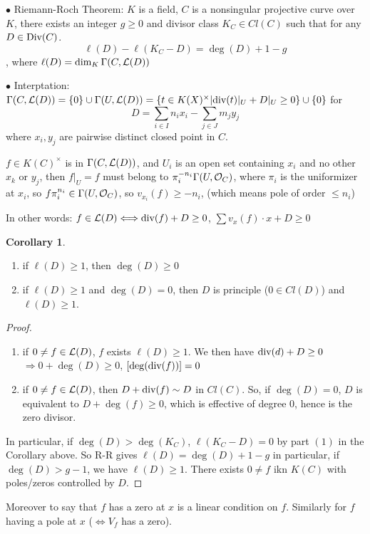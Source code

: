 \documentclass[11pt]{article}
\theoremstyle{definition}
\newtheorem{cor}[thm]{Corollary}
\newcommand{\call}{{\cal L}}
\newcommand{\calo}{{\cal O}}
\renewcommand{\div}{\textnormal{div}}
\newcommand{\Div}{\textnormal{Div}}
\newcommand{\Lrta}{\Longrightarrow}
\newcommand{\Llrta}{\Longleftrightarrow}
\begin{document}
$\bullet$ Riemann-Roch Theorem: $K$ is a field, $C$ is a nonsingular projective curve over $K$, there exists an integer $g\geq 0$ and divisor class $K_C\in Cl(C)$ such that for any $D\in \Div(C)$.
$$
\ell(D)-\ell(K_C-D)=\deg(D)+1-g
$$
, where $\ell(D)=\dim_K\Gamma(C,\call(D))$

$\bullet$ Interptation: $\Gamma(C,\call(D))=\{0\}\cup \Gamma(U,\call(D))=\{t\in K(X)^\times| \div(t)|_U+D|_U \geq 0\}\cup \{0\}$ for 
$$
D=\sum_{i\in I} n_i x_i-\sum_{j\in J} m_j y_j
$$
where $x_i,y_j$ are pairwise distinct closed point in $C$.

$f\in K(C)^\times$ is in $\Gamma(C,\call(D))$, and $U_i$ is an open set containing $x_i$ and no other $x_k$ or $y_j$, then $f|_U=f$ must belong to $\pi_i^{-n_i}\Gamma(U,\calo_C)$, where $\pi_i$ is the uniformizer at $x_i$, so $f\pi_i^{n_i}\in \Gamma(U,\calo_C)$, so $v_{x_i}(f)\geq -n_i$, (which means pole of order $\leq n_i$)

In other words: $f\in \call(D)\Llrta \div(f)+D\geq 0$, $\sum v_x(f)\cdot x+D\geq 0$

\begin{cor}\ 
\begin{enumerate}[label=(\arabic*)]
\item if $\ell(D)\geq 1$, then $\deg(D)\geq 0$
\item if $\ell(D)\geq 1$ and $\deg(D)=0$, then $D$ is principle ($0\in Cl(D)$) and $\ell(D)\geq 1$.
\end{enumerate}
\end{cor}
\begin{proof}\ 
\begin{enumerate}[label=(\arabic*)]
\item if $0\neq f\in \call(D)$, $f$ exists $\ell(D)\geq 1$. We then have $\div(d)+D\geq 0$ $\Lrta 0+\deg(D)\geq 0$, $[\deg(\div(f))]=0$
\item if $0\neq f\in \call(D)$, then $D+\div(f)\sim D$ in $Cl(C)$. So, if $\deg(D)=0$, $D$ is equivalent to $D+\deg(f)\geq 0$, which is effective of degree $0$, hence is the zero divisor.
\end{enumerate}

In particular, if $\deg(D)>\deg(K_C)$, $\ell(K_C-D)=0$ by part $(1)$ in the Corollary above. So R-R
 gives $\ell(D)=\deg(D)+1-g$ in particular, if $\deg(D)>g-1$,  we have $\ell(D)\geq 1$. There exists $0\neq f$ ikn $K(C)$ with poles/zeros controlled by $D$.
 \end{proof}

 Moreover to say that $f$ has a zero at $x$ is a linear condition on $f$. Similarly for $f$ having  a pole at $x$ ($\Llrta V_f$ has a zero).
\end{document}
